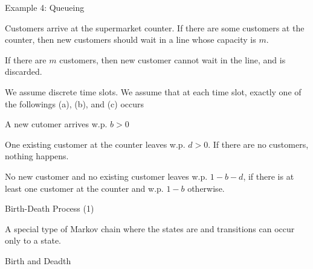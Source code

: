 \begin{frame}{Example 4: Queueing}

  {
    \small
    \plitemsep 0.03in
    \bci
    
  \item Customers arrive at the supermarket counter. If there are some
    customers at the counter, then new customers should wait in a line
    whose capacity is $m.$

  \item<2-> If there are $m$ customers, then new
    customer cannot wait in the line, and is discarded. 


  \item<3-> We assume discrete time slots. We assume that at each time
    slot,  exactly one of the followings (a), (b), and (c) occurs

    \eci
  }
  {
  \small
  \plitemsep 0.03in
  
    \bce[(a)]
  \item<4-> A new cutomer arrives w.p. $b >0$
  \item<5-> One existing customer at the counter leaves w.p. $d >0.$ If
    there are no customers, nothing happens.  
  \item<6-> No new customer and no existing customer leaves w.p. $1-b-d$,
    if there is at least one customer at the counter and w.p. $1-b$
    otherwise. 


    \ece
}

\vspace{-0.6cm}

\end{frame}

\begin{frame}{Birth-Death Process (1)}

  \plitemsep 0.07in
  \bci
  
\item<2-> A special type of Markov chain where the states are 
  and transitions can occur only to a  state. 

\item<3-> Birth and Deadth
  
  \eci
  
\vspace{-0.5cm}
\end{frame}

